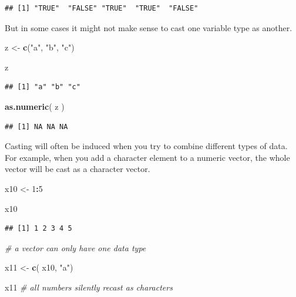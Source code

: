 \documentclass[]{book}
\newenvironment{Shaded}{\begin{snugshade}}{\end{snugshade}}
\newcommand{\CommentTok}[1]{\textcolor[rgb]{0.56,0.35,0.01}{\textit{#1}}}
\newcommand{\DecValTok}[1]{\textcolor[rgb]{0.00,0.00,0.81}{#1}}
\newcommand{\KeywordTok}[1]{\textcolor[rgb]{0.13,0.29,0.53}{\textbf{#1}}}
\newcommand{\NormalTok}[1]{#1}
\newcommand{\OperatorTok}[1]{\textcolor[rgb]{0.81,0.36,0.00}{\textbf{#1}}}
\newcommand{\StringTok}[1]{\textcolor[rgb]{0.31,0.60,0.02}{#1}}
\theoremstyle{definition}
\theoremstyle{definition}
\theoremstyle{definition}
\theoremstyle{remark}
\begin{document}
\begin{verbatim}
## [1] "TRUE"  "FALSE" "TRUE"  "TRUE"  "FALSE"
\end{verbatim}

But in some cases it might not make sense to cast one variable type as
another.

\begin{Shaded}
\begin{Highlighting}[]
\NormalTok{z <-}\StringTok{ }\KeywordTok{c}\NormalTok{(}\StringTok{"a"}\NormalTok{, }\StringTok{"b"}\NormalTok{, }\StringTok{"c"}\NormalTok{)}

\NormalTok{z}
\end{Highlighting}
\end{Shaded}

\begin{verbatim}
## [1] "a" "b" "c"
\end{verbatim}

\begin{Shaded}
\begin{Highlighting}[]
\KeywordTok{as.numeric}\NormalTok{( z )}
\end{Highlighting}
\end{Shaded}

\begin{verbatim}
## [1] NA NA NA
\end{verbatim}

Casting will often be induced when you try to combine different types of
data. For example, when you add a character element to a numeric vector,
the whole vector will be cast as a character vector.

\begin{Shaded}
\begin{Highlighting}[]
\NormalTok{x10 <-}\StringTok{ }\DecValTok{1}\OperatorTok{:}\DecValTok{5}

\NormalTok{x10}
\end{Highlighting}
\end{Shaded}

\begin{verbatim}
## [1] 1 2 3 4 5
\end{verbatim}

\begin{Shaded}
\begin{Highlighting}[]
\CommentTok{# a vector can only have one data type}

\NormalTok{x11 <-}\StringTok{ }\KeywordTok{c}\NormalTok{( x10, }\StringTok{"a"}\NormalTok{)}

\NormalTok{x11 }\CommentTok{# all numbers silently recast as characters}
\end{Highlighting}
\end{Shaded}
\end{document}
